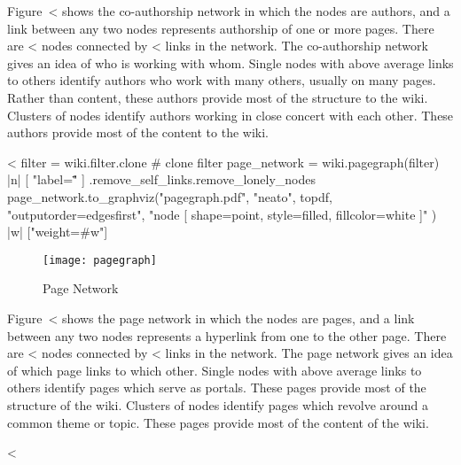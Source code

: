 \documentclass{scrartcl}
\begin{document}
Figure~<%
shows the co-authorship network in which the nodes are authors, and a link between any two nodes represents authorship of one or more pages. There are <%
nodes connected by <%
links in the network. The co-authorship network gives an idea of who is working with whom. Single nodes with above average links to others identify authors who work with many others, usually on many pages. Rather than content, these authors provide most of the structure to the wiki. Clusters of nodes identify authors working in close concert with each other. These authors provide most of the content to the wiki.

<%
filter = wiki.filter.clone # clone filter
page_network = wiki.pagegraph(filter) { |n| [ "label=\"\"" ] }.remove_self_links.remove_lonely_nodes
page_network.to_graphviz("pagegraph.pdf", "neato", topdf, "outputorder=edgesfirst", "node [ shape=point, style=filled, fillcolor=white ]" ) { |w|  ["weight=#{w}"] }

\begin{figure}
	\centering
	\texttt{[image: pagegraph]}
	\caption{Page Network}
	\label{fig:page_network}
\end{figure}

Figure~<%
shows the page network in which the nodes are pages, and a link between any two nodes represents a hyperlink from one to the other page. There are <%
nodes connected by <%
links in the network.  The page network gives an idea of which page links to which other. Single nodes with above average links to others identify pages which serve as portals. These pages provide most of the structure of the wiki. Clusters of nodes identify pages which revolve around a common theme or topic. These pages provide most of the content of the wiki.


<%
\end{document}

